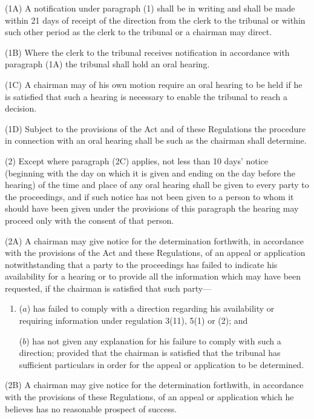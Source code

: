 \documentclass[a4paper]{article}
\begin{document}
(1A) A notification under paragraph (1) shall be in writing and shall be made within 21 days of receipt of the direction from the clerk to the tribunal or within such other period as the clerk to the tribunal or a chairman may direct.

(1B) Where the clerk to the tribunal receives notification in accordance with paragraph (1A) the tribunal shall hold an oral hearing.

(1C) A chairman may of his own motion require an oral hearing to be held if he is satisfied that such a hearing is necessary to enable the tribunal to reach a decision.

(1D) Subject to the provisions of the Act and of these Regulations the procedure in connection with an oral hearing shall be such as the chairman shall determine.

(2) 
Except where paragraph (2C) applies,  %
not less than 10 days' notice (beginning with the day on which it is given and ending on the day before the hearing) of 
the time and place of any oral hearing  %
shall be given to every party to the proceedings, and if such notice has not been given to a person to whom it should have been given under the provisions of this paragraph the hearing may proceed only with the consent of that person.

(2A) A chairman may give notice for the determination forthwith, in accordance with the provisions of the Act and these Regulations, of an appeal or application notwithstanding that a party to the proceedings has failed to indicate his availability for a hearing or to provide all the information which may have been requested, if the chairman is satisfied that such party—
\begin{enumerate}\item[]
($a$) has failed to comply with a direction regarding his availability or requiring information under regulation 3(11), 5(1) or (2); and

($b$) has not given any explanation for his failure to comply with such a direction; provided that the chairman is satisfied that the tribunal has sufficient particulars in order for the appeal or application to be determined.
\end{enumerate}

(2B) A chairman may give notice for the determination forthwith, in accordance with the provisions of these Regulations, of an appeal or application which he believes has no reasonable prospect of success.
\end{document}
